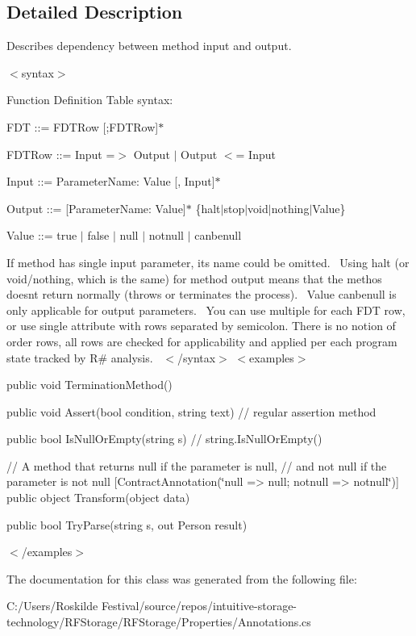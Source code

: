 \subsection{Detailed Description}
Describes dependency between method input and output. 

$<$syntax$>$ 

Function Definition Table syntax\+:


\begin{DoxyItemize}
\item F\+DT \+::= F\+D\+T\+Row [;F\+D\+T\+Row]$\ast$ 
\item F\+D\+T\+Row \+::= Input =$>$ Output $\vert$ Output $<$= Input 
\item Input \+::= Parameter\+Name\+: Value [, Input]$\ast$ 
\item Output \+::= [Parameter\+Name\+: Value]$\ast$ \{halt$\vert$stop$\vert$void$\vert$nothing$\vert$\+Value\} 
\item Value \+::= true $\vert$ false $\vert$ null $\vert$ notnull $\vert$ canbenull 
\end{DoxyItemize}If method has single input parameter, it\textquotesingle{}s name could be omitted.~\newline
 Using {\ttfamily halt} (or {\ttfamily void}/{\ttfamily nothing}, which is the same) for method output means that the methos doesn\textquotesingle{}t return normally (throws or terminates the process).~\newline
 Value {\ttfamily canbenull} is only applicable for output parameters.~\newline
 You can use multiple {} for each F\+DT row, or use single attribute with rows separated by semicolon. There is no notion of order rows, all rows are checked for applicability and applied per each program state tracked by R\# analysis.~\newline
 $<$/syntax$>$ $<$examples$>$
\begin{DoxyItemize}
\item {\ttfamily  [Contract\+Annotation(\char`\"{}=> halt\char`\"{})] public void Termination\+Method() } 
\item {\ttfamily  [Contract\+Annotation(\char`\"{}halt <= condition\+: false\char`\"{})] public void Assert(bool condition, string text) // regular assertion method } 
\item {\ttfamily  [Contract\+Annotation(\char`\"{}s\+:null => true\char`\"{})] public bool Is\+Null\+Or\+Empty(string s) // string.\+Is\+Null\+Or\+Empty() } 
\item {\ttfamily  // A method that returns null if the parameter is null, // and not null if the parameter is not null [Contract\+Annotation(\char`\"{}null => null; notnull => notnull\char`\"{})] public object Transform(object data) } 
\item {\ttfamily  [Contract\+Annotation(\char`\"{}=> true, result\+: notnull; => false, result\+: null\char`\"{})] public bool Try\+Parse(string s, out Person result) } 
\end{DoxyItemize}$<$/examples$>$ 

The documentation for this class was generated from the following file\+:\begin{DoxyCompactItemize}
\item 
C\+:/\+Users/\+Roskilde Festival/source/repos/intuitive-\/storage-\/technology/\+R\+F\+Storage/\+R\+F\+Storage/\+Properties/Annotations.\+cs\end{DoxyCompactItemize}
